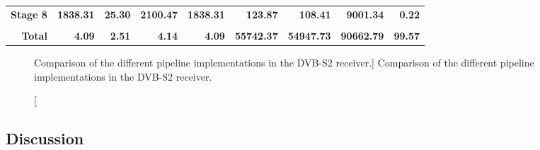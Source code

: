 \begin{table}[htp]
{{\begin{tabular}{r | r r r r  | r r r | r}
                 \textbf{Stage 8}                                             & \textbf{1838.31} &    \textbf{25.30} &  \textbf{2100.47} &                        \textbf{1838.31} &   \textbf{123.87} &   \textbf{108.41} &  \textbf{9001.34} &  \textbf{0.22} \\ %
                                                                              &                  &                   &                   &                                         &                   &                   &                   &                \\ \hline \hline
                 \textbf{Total}                                               &    \textbf{4.09} &     \textbf{2.51} &     \textbf{4.14} &                           \textbf{4.09} & \textbf{55742.37} & \textbf{54947.73} & \textbf{90662.79} & \textbf{99.57} \\ %

  \end{tabular}
  }}
\end{table}

\begin{figure}[htp]
  \centering
  \quad
  \caption
    [Comparison of the different pipeline implementations in the DVB-S2 receiver.]
    {Comparison of the different pipeline implementations in the DVB-S2 receiver.}
  \label{fig:dvbs2_pipeline}
\end{figure}

\subsection{Discussion}
